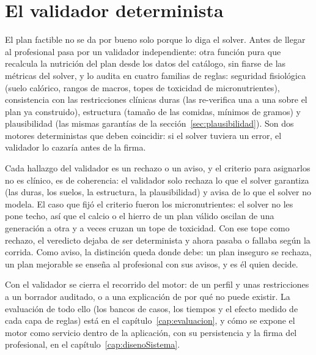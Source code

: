 \section{El validador determinista}
\label{sec:validador}

El plan factible no se da por bueno solo porque lo diga el solver. Antes de llegar al profesional pasa por un validador independiente: otra función pura que recalcula la nutrición del plan desde los datos del catálogo, sin fiarse de las métricas del solver, y lo audita en cuatro familias de reglas: seguridad fisiológica (suelo calórico, rangos de macros, topes de toxicidad de micronutrientes), consistencia con las restricciones clínicas duras (las re-verifica una a una sobre el plan ya construido), estructura (tamaño de las comidas, mínimos de gramos) y plausibilidad (las mismas garantías de la sección~\ref{sec:plausibilidad}). Son dos motores deterministas que deben coincidir: si el solver tuviera un error, el validador lo cazaría antes de la firma.

Cada hallazgo del validador es un rechazo o un aviso, y el criterio para asignarlos no es clínico, es de coherencia: el validador solo rechaza lo que el solver garantiza (las duras, los suelos, la estructura, la plausibilidad) y avisa de lo que el solver no modela. El caso que fijó el criterio fueron los micronutrientes: el solver no les pone techo, así que el calcio o el hierro de un plan válido oscilan de una generación a otra y a veces cruzan un tope de toxicidad. Con ese tope como rechazo, el veredicto dejaba de ser determinista y ahora pasaba o fallaba según la corrida. Como aviso, la distinción queda donde debe: un plan inseguro se rechaza, un plan mejorable se enseña al profesional con sus avisos, y es él quien decide.

Con el validador se cierra el recorrido del motor: de un perfil y unas restricciones a un borrador auditado, o a una explicación de por qué no puede existir. La evaluación de todo ello (los bancos de casos, los tiempos y el efecto medido de cada capa de reglas) está en el capítulo~\ref{cap:evaluacion}, y cómo se expone el motor como servicio dentro de la aplicación, con su persistencia y la firma del profesional, en el capítulo~\ref{cap:disenoSistema}.

